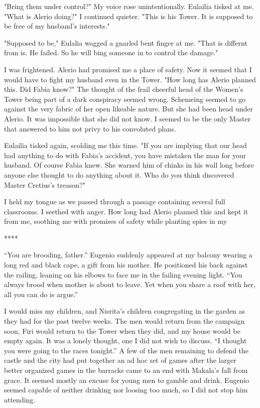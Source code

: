 \documentclass{article}
\begin{document}
"Bring them under control?" My voice rose unintentionally. Eulailia tisked at me. "What is Alerio doing?" I continued quieter. "This is his Tower. It is supposed to be free of my husband's interests."

"Supposed to be," Eulalia wagged a gnarled bent finger at me. "That is differnt from is. He failed. So he will bing someone in to control the damage."

I was frightened. Alerio had promised me a place of safety. Now it seemed that I would have to fight my husband even in the Tower. "How long has Alerio planned this. Did Fabia know?" The thought of the frail cheerful head of the Women's Tower being part of a dark conspiracy seemed wrong. Schemeing seemed to go against the very fabric of her open likeable nature. But she had been head under Alerio. It was impossible that she did not know. I seemed to be the only Master that answered to him not privy to his convoluted plans.

Eulailia tisked again, scolding me this time. "If you are implying that our head had anything to do with Fabia's accident, you have mistaken the man for your husband. Of course Fabia knew. She warned him of chinks in his wall long before anyone else thought to do anything about it. Who do you think discovered Master Cretius's treason?"

I held my tongue as we passed through a passage containing several full classrooms. I seethed with anger. How long had Alerio planned this and kept it from me, soothing me with promises of safety while planting spies in my

****

``You are brooding, father.'' Eugenio suddenly appeared at my balcony
wearing a long red and black cape, a gift from his mother. He
positioned his back against the railing, leaning on his elbows to face
me in the failing evening light. ``You always brood when mother is
about to leave. Yet when you share a roof with her, all you can do is
argue.''

I would miss my children, and Nisrita's children congregating in the
garden as they had for the past twelve weeks. The men would return
from the campaign soon, Firi would return to the Tower when they did,
and my house would be empty again. It was a lonely thought, one I did
not wish to discuss. ``I thought you were going to the races
tonight.'' A few of the men remaining to defend the castle and the
city had put together an ad hoc set of games after the larger better
organized games in the barracks came to an end with Makala's fall from
grace. It seemed mostly an excuse for young men to gamble and
drink. Eugenio seemed capable of neither drinking nor loosing too
much, so I did not stop him attending.
\end{document}
